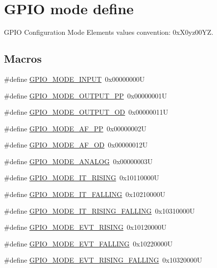 \hypertarget{group___g_p_i_o__mode__define}{}\section{G\+P\+IO mode define}
\label{group___g_p_i_o__mode__define}


G\+P\+IO Configuration Mode Elements values convention\+: 0x\+X0yz00\+YZ.  


\subsection*{Macros}
\begin{DoxyCompactItemize}
\item 
\#define \hyperlink{group___g_p_i_o__mode__define_gaf40bec3146810028a84b628d37d3b391}{G\+P\+I\+O\+\_\+\+M\+O\+D\+E\+\_\+\+I\+N\+P\+UT}~0x00000000U
\item 
\#define \hyperlink{group___g_p_i_o__mode__define_ga1013838a64cec2f8c88f079c449d1982}{G\+P\+I\+O\+\_\+\+M\+O\+D\+E\+\_\+\+O\+U\+T\+P\+U\+T\+\_\+\+PP}~0x00000001U
\item 
\#define \hyperlink{group___g_p_i_o__mode__define_ga2f91757829f6e9505ec386b840941929}{G\+P\+I\+O\+\_\+\+M\+O\+D\+E\+\_\+\+O\+U\+T\+P\+U\+T\+\_\+\+OD}~0x00000011U
\item 
\#define \hyperlink{group___g_p_i_o__mode__define_ga526c72c5264316fc05c775b6cad4aa6a}{G\+P\+I\+O\+\_\+\+M\+O\+D\+E\+\_\+\+A\+F\+\_\+\+PP}~0x00000002U
\item 
\#define \hyperlink{group___g_p_i_o__mode__define_ga282b9fd37c8ef31daba314ffae6bf023}{G\+P\+I\+O\+\_\+\+M\+O\+D\+E\+\_\+\+A\+F\+\_\+\+OD}~0x00000012U
\item 
\#define \hyperlink{group___g_p_i_o__mode__define_ga7a04f9ab65ad572ad20791a35009220c}{G\+P\+I\+O\+\_\+\+M\+O\+D\+E\+\_\+\+A\+N\+A\+L\+OG}~0x00000003U
\item 
\#define \hyperlink{group___g_p_i_o__mode__define_ga088659562e68426d9a72821ea4fd8d50}{G\+P\+I\+O\+\_\+\+M\+O\+D\+E\+\_\+\+I\+T\+\_\+\+R\+I\+S\+I\+NG}~0x10110000U
\item 
\#define \hyperlink{group___g_p_i_o__mode__define_gaa166210a6da3ac7e8d7504702520e522}{G\+P\+I\+O\+\_\+\+M\+O\+D\+E\+\_\+\+I\+T\+\_\+\+F\+A\+L\+L\+I\+NG}~0x10210000U
\item 
\#define \hyperlink{group___g_p_i_o__mode__define_ga0678e61090ed61e91a6496f22ddfb3d1}{G\+P\+I\+O\+\_\+\+M\+O\+D\+E\+\_\+\+I\+T\+\_\+\+R\+I\+S\+I\+N\+G\+\_\+\+F\+A\+L\+L\+I\+NG}~0x10310000U
\item 
\#define \hyperlink{group___g_p_i_o__mode__define_ga97d78b82ea178ff7a4c35aa60b4e9338}{G\+P\+I\+O\+\_\+\+M\+O\+D\+E\+\_\+\+E\+V\+T\+\_\+\+R\+I\+S\+I\+NG}~0x10120000U
\item 
\#define \hyperlink{group___g_p_i_o__mode__define_gadbfa532b3566783ac6c0e07c2e0ffe5e}{G\+P\+I\+O\+\_\+\+M\+O\+D\+E\+\_\+\+E\+V\+T\+\_\+\+F\+A\+L\+L\+I\+NG}~0x10220000U
\item 
\#define \hyperlink{group___g_p_i_o__mode__define_ga1b760771297ed2fc55a6b13071188491}{G\+P\+I\+O\+\_\+\+M\+O\+D\+E\+\_\+\+E\+V\+T\+\_\+\+R\+I\+S\+I\+N\+G\+\_\+\+F\+A\+L\+L\+I\+NG}~0x10320000U
\end{DoxyCompactItemize}



